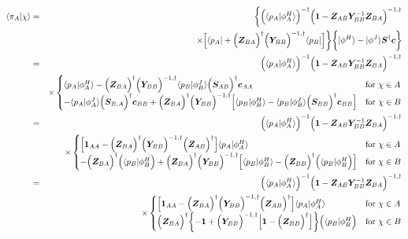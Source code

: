 \documentclass[11pt,a4paper]{report}
\begin{document}
\begin{eqnarray}
\langle\pi_A|\chi\rangle
&=&
\biggl\lbrace
\Bigl(\langle{p}_A|\phi^H_A\rangle\Bigr)^{-1}
\Bigl(\mat{1}-\mat{Z}_{AB}\mat{Y}_{BB}^{-1}\mat{Z}_{BA}\Bigr)^{-1,\dagger}
\nonumber\\
&&\times
\Bigl[\langle{p}_A|+\Bigl(\mat{Z}_{BA}\Bigr)^\dagger
\Bigl(\mat{Y}_{BB}\Bigr)^{-1,\dagger}
\langle{p}_B|\Bigr]
\biggr\rbrace
\biggl\lbrace
|\phi^H\rangle
-|\phi^J\rangle\mat{S}^\dagger\mat{c}\biggr\rbrace
\nonumber\\
%
%
%
&=&
\Bigl(\langle{p}_A|\phi^H_A\rangle\Bigr)^{-1}
\Bigl(\mat{1}-\mat{Z}_{AB}\mat{Y}_{BB}^{-1}\mat{Z}_{BA}\Bigr)^{-1,\dagger}
\nonumber\\
&&\times
\begin{cases}
\langle{p}_A|\phi^H_A\rangle
-
\Bigl(\mat{Z}_{BA}\Bigr)^\dagger
\Bigl(\mat{Y}_{BB}\Bigr)^{-1,\dagger}
\langle{p}_B|\phi^J_B\rangle\Bigl(\mat{S}_{AB}\Bigr)^\dagger\mat{c}_{AA}
&\text{for $\chi\in A$}
\\
-\langle{p}_A|\phi^J_A\rangle\Bigl(\mat{S}_{B,A}\Bigr)^\dagger\mat{c}_{BB}
+\Bigl(\mat{Z}_{BA}\Bigr)^\dagger
\Bigl(\mat{Y}_{BB}\Bigr)^{-1,\dagger}
\Bigl[\langle{p}_B|\phi^H_{B}\rangle
-
\langle{p}_B|\phi^J_{B}\rangle\Bigl(\mat{S}_{BB}\Bigr)^\dagger\mat{c}_{BB}
\Bigr]
&\text{for $\chi\in B$}
\end{cases}
\nonumber\\
%
%
%
&=&
\Bigl(\langle{p}_A|\phi^H_A\rangle\Bigr)^{-1}
\Bigl(\mat{1}-\mat{Z}_{AB}\mat{Y}_{BB}^{-1}\mat{Z}_{BA}\Bigr)^{-1,\dagger}
\nonumber\\
&&\times
\begin{cases}
\Bigl[
\mat{1}_{AA}
-
\Bigl(\mat{Z}_{BA}\Bigr)^\dagger
\Bigl(\mat{Y}_{BB}\Bigr)^{-1,\dagger}
\Bigl(\mat{Z}_{AB}\Bigr)^\dagger
\Bigr]
\langle{p}_A|\phi^H_A\rangle
&\text{for $\chi\in A$}
\\
-\Bigl(\mat{Z}_{BA}\Bigr)^\dagger\Bigl(\langle{p}_B|\phi^H_B\Bigr)
+\Bigl(\mat{Z}_{BA}\Bigr)^\dagger
\Bigl(\mat{Y}_{BB}\Bigr)^{-1,\dagger}
\Bigl[\langle{p}_B|\phi^H_{B}\rangle
-
\Bigl(\mat{Z}_{BB}\Bigr)^\dagger\Bigl(\langle{p}_B|\phi^H_B\Bigr)
\Bigr]
&\text{for $\chi\in B$}
\end{cases}
\nonumber\\
%
%
%
&=&
\Bigl(\langle{p}_A|\phi^H_A\rangle\Bigr)^{-1}
\Bigl(\mat{1}-\mat{Z}_{AB}\mat{Y}_{BB}^{-1}\mat{Z}_{BA}\Bigr)^{-1,\dagger}
\nonumber\\
&&\times
\begin{cases}
\Bigl[
\mat{1}_{AA}
-
\Bigl(\mat{Z}_{BA}\Bigr)^\dagger
\Bigl(\mat{Y}_{BB}\Bigr)^{-1,\dagger}
\Bigl(\mat{Z}_{AB}\Bigr)^\dagger
\Bigr]
\langle{p}_A|\phi^H_A\rangle
&\text{for $\chi\in A$}
\\
\Bigl(\mat{Z}_{BA}\Bigr)^\dagger
\biggl\lbrace
-
\mat{1}
+
\Bigl(\mat{Y}_{BB}\Bigr)^{-1,\dagger}
\Bigl[\mat{1}
-
\Bigl(\mat{Z}_{BB}\Bigr)^\dagger
\Bigr]
\biggr\rbrace\Bigl(\langle{p}_B|\phi^H_B\Bigr)
&\text{for $\chi\in B$}
\end{cases}
\end{eqnarray}
\end{document}
